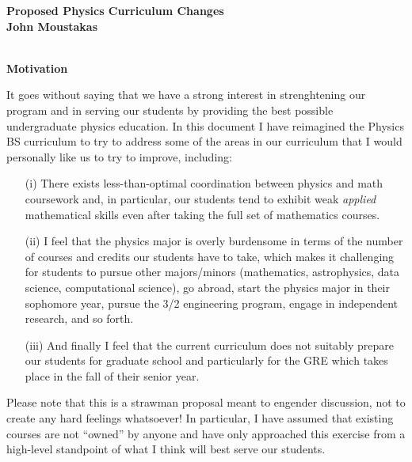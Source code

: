 \documentclass[12pt,preprint]{aastex}
\begin{document}
\vspace*{-1.2in} 
\begin{center}
{\Large {\bf\sc Proposed Physics Curriculum Changes}} \\
\vspace*{2mm} 
{\bf\sc John Moustakas} \\
\vspace*{2mm} 
 \\
\vspace*{0.1in} 
\end{center}

{\large \sc \textbf{Motivation}}


It goes without saying that we have a strong interest in strenghtening our
program and in serving our students by providing the best possible undergraduate
physics education.  In this document I have reimagined the Physics BS curriculum
to try to address some of the areas in our curriculum that I would personally
like us to try to improve, including: 
\begin{itemize}
  \item[(i)]{There exists less-than-optimal coordination between physics and
    math coursework and, in particular, our students tend to exhibit weak
    \emph{applied} mathematical skills even after taking the full set of
    mathematics courses.}
  \item[(ii)]{I feel that the physics major is overly burdensome in terms of the
    number of courses and credits our students have to take, which makes it
    challenging for students to pursue other majors/minors (mathematics,
    astrophysics, data science, computational science), go abroad, start the
    physics major in their sophomore year, pursue the 3/2 engineering program,
    engage in independent research, and so forth.}
  \item[(iii)]{And finally I feel that the current curriculum does not suitably
    prepare our students for graduate school and particularly for the GRE which
    takes place in the fall of their senior year.}
\end{itemize}
Please note that this is a strawman proposal meant to engender discussion, not
to create any hard feelings whatsoever!  In particular, I have assumed that
existing courses are not ``owned'' by anyone and have only approached this
exercise from a high-level standpoint of what I think will best serve our
students. 
\end{document}

